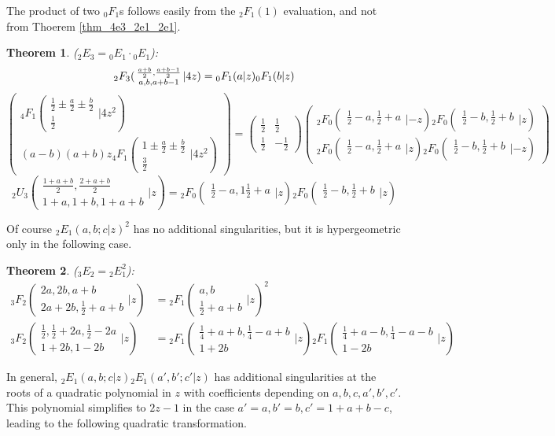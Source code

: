 \documentclass[12pt]{article}
\numberwithin{equation}{section}
\newtheorem{theorem}{Theorem}[section]
\newcommand{\Head}[3] {{}_{#1}{#2}_{#3}}
\newcommand{\ArgS}[3] {( \begin{smallmatrix} #1 \\ #2 \end{smallmatrix} | {#3})}
\begin{document}
The product of two $\Head{0}{F}{1}$s follows easily from the $\Head{2}{F}{1}(1)$ evaluation, and not from Thoerem \ref{thm_4e3_2e1_2e1}.
\begin{theorem}
\label{thm_0f1_prod}
($\Head{2}{E}{3} = \Head{0}{E}{1} \cdot \Head{0}{E}{1}$):
\begin{equation*}
\Head{2}{F}{3} \ArgS{\frac{a+b}{2},\frac{a+b-1}{2}}{a,b,a+b-1}{4z} = \Head{0}{F}{1}(a|z)\Head{0}{F}{1}(b|z)\\
\end{equation*}
\begin{equation*}
\left(\begin{array}{r}
\Head{4}{F}{1} \ArgS{\frac12 \pm \frac{a}{2} \pm \frac{b}{2}} {\frac12} {4 z^2}\\
(a - b) (a + b) z \Head{4}{F}{1} \ArgS{1 \pm \frac{a}{2} \pm \frac{b}{2}} {\frac32} {4 z^2}
\end{array}\right)
 =
\begin{pmatrix}
\frac12 & \frac12 \\
\frac12 & -\frac12
\end{pmatrix}
\begin{pmatrix}
\Head{2}{F}{0}\ArgS{\frac12 - a, \frac12 + a}{}{-z} \Head{2}{F}{0} \ArgS{\frac12 - b, \frac12 + b}{}{z}\\
\Head{2}{F}{0} \ArgS{\frac12 - a, \frac12 + a} {}{z} \Head{2}{F}{0} \ArgS{\frac12 - b, \frac12+ b} {}{-z}
\end{pmatrix}
\end{equation*}
\begin{equation*}
\Head{2}{U}{3} \ArgS{\frac{1+a+b}2,\frac{2+a+b}2}{1+a,1+b,1+a+b}{z} = \Head{2}{F}{0} \ArgS{\frac12 - a, 1\frac12+a}{}{z} \Head{2}{F}{0} \ArgS{\frac12-b, \frac12+b} {}{z}
\end{equation*}
\end{theorem}
Of course $\Head{2}{E}{1}(a,b;c|z)^2$ has no additional singularities, but it is hypergeometric only in the following case.
\begin{theorem}
($\Head{3}{E}{2} = \Head{2}{E}{1}^2$):
\begin{align*}
\Head{3}{F}{2} \ArgS{2a,2b,a+b}{2a+2b,\frac12+a+b}{z} &= \Head{2}{F}{1} \ArgS{a,b}{\frac12+a+b}{z}^2\\
\Head{3}{F}{2} \ArgS{\frac12,\frac12 + 2a,\frac12-2a}{1+2b,1-2b}{z} &= \Head{2}{F}{1} \ArgS{\frac14+a+b,\frac14-a+b}{1+2b}{z} \Head{2}{F}{1} \ArgS{\frac14+a-b,\frac14-a-b}{1-2b}{z}
\end{align*}
\end{theorem}
In general, $\Head{2}{E}{1}(a,b;c|z)\Head{2}{E}{1}(a',b';c'|z)$ has additional singularities at the roots of a quadratic polynomial in $z$ with coefficients depending on $a,b,c,a',b',c'$. This polynomial simplifies to $2z-1$ in the case $a'=a, b'=b, c'=1+a+b-c$, leading to the following quadratic transformation.
\end{document}
